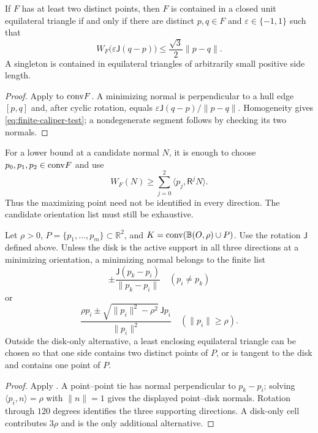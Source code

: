 \begin{theorem}
\label{thm:cert-caliper}
If $F$ has at least two distinct points, then $F$ is contained in a closed
unit equilateral triangle if and only if there are distinct $p,q\in F$ and
$\varepsilon\in\{-1,1\}$ such that
\begin{equation}
 W_F\bigl(\varepsilon\mathsf J(q-p)\bigr)
 \le\frac{\sqrt3}{2}\lVert p-q\rVert.
 \label{eq:finite-caliper-test}
\end{equation}
A singleton is contained in equilateral triangles of arbitrarily small
positive side length.
\end{theorem}

\begin{proof}
Apply 
to $\mathrm{conv} F$. A minimizing normal is perpendicular to a hull edge
$[p,q]$ and, after cyclic
rotation, equals
$\varepsilon\mathsf J(q-p)/\lVert p-q\rVert$.  Homogeneity gives
\eqref{eq:finite-caliper-test}; a nondegenerate segment follows by checking
its two normals.

\end{proof}

For a lower bound at a candidate normal $N$, it is enough to choose
$p_0,p_1,p_2\in\mathrm{conv} F$ and use
\[
 W_F(N)\ge\sum_{j=0}^2\langle p_j,\mathsf R^jN\rangle.
\]
Thus the maximizing point need not be identified in every direction.
The candidate orientation list must still be exhaustive.

\begin{proposition}
\label{prop:new-disk-finite-caliper}
Let $\rho>0$, $P=\{p_1,\ldots,p_m\}\subset\mathbb R^2$, and
$K=\mathrm{conv}(\mathbb B(O,\rho)\cup P)$. Use the rotation $\mathsf J$
defined above. Unless the disk is the active support in all three directions at a minimizing
orientation, a minimizing normal belongs to the finite list
\[
 \pm\frac{\mathsf J(p_k-p_i)}{\|p_k-p_i\|}
 \quad(p_i\ne p_k)
\]
or
\[
 \frac{\rho p_i\pm
 \sqrt{\|p_i\|^2-\rho^2}\,\mathsf Jp_i}{\|p_i\|^2}
 \quad(\|p_i\|\ge\rho).
\]
Outside the disk-only alternative, a least enclosing equilateral triangle
can be chosen so that one side contains two distinct points of $P$, or is
tangent to the disk and contains one point of $P$.
\end{proposition}

\begin{proof}
Apply . A point--point tie has normal
perpendicular to $p_k-p_i$; solving $\langle p_i,n\rangle=\rho$ with
$\|n\|=1$ gives the displayed point--disk normals. Rotation through
$120$ degrees identifies the three supporting directions. A disk-only
cell contributes $3\rho$ and is the only additional alternative.
\end{proof}


